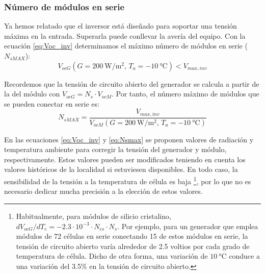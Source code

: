 \subsubsection{Número de módulos en serie}
\label{sec:Ns}

Ya hemos relatado que el inversor está diseñado para soportar una
tensión máxima en la entrada. Superarla puede conllevar la avería
del equipo. Con la ecuación \ref{eq:Voc_inv} determinamos el máximo
número de módulos en serie ($N_{sMAX}$):
\begin{equation}
V_{ocG}(G=\SI{200}{\watt\per\meter\squared},\,
T_{a}=\SI{-10}{\celsius})<V_{max,inv}
\label{eq:Voc_inv}
\end{equation}


Recordemos que la tensión de circuito abierto del generador se calcula
a partir de la del módulo con $V_{ocG}=N_{s}\cdot V_{ocM}$.
Por tanto, el número máximo de módulos que se pueden conectar en
serie es:
\begin{equation}
  \label{eq:Nsmax}
  N_{sMAX}=\frac{V_{max,inv}}{V_{ocM}(G=\SI{200}{\watt\per\meter\squared},\, T_{a}=\SI{-10}{\celsius})}
\end{equation}


En las ecuaciones \ref{eq:Voc_inv} y \ref{eq:Nsmax} se proponen
valores de radiación y temperatura ambiente para corregir la tensión
del generador y módulo, respectivamente.  Estos valores pueden ser
modificados teniendo en cuenta los valores históricos de la localidad
si estuviesen disponibles. En todo caso, la sensibilidad de la tensión
a la temperatura de célula es baja%
\footnote{Habitualmente, para módulos de silicio cristalino,
  $dV_{ocG}/dT_{c}=-2.3\cdot10^{-3}\cdot N_{cs}\cdot
  N_{s}$.  Por ejemplo, para un generador que emplea módulos
  de 72 células en serie conectando 15 de estos módulos en serie, la
  tensión de circuito abierto varía alrededor de 2.5 voltios por cada
  grado de temperatura de célula. Dicho de otra forma, una variación
  de $\SI{10}{\celsius}$ conduce a una variación del 3.5\% en la
  tensión de circuito abierto.%
}, por lo que no es necesario dedicar mucha precisión a la elección de
estos valores.

